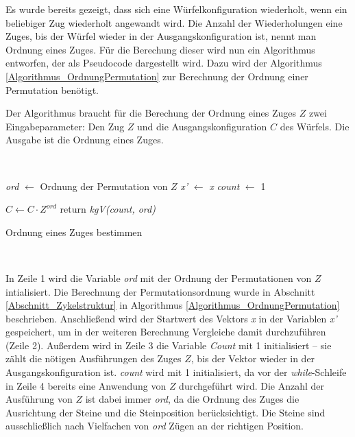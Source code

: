 \documentclass[12pt,a4paper, usenames, dvipsnames]{article}
\theoremstyle{mystyle}
\theoremstyle{definition}
\begin{document}
Es wurde bereits gezeigt, dass sich eine Würfelkonfiguration wiederholt, wenn ein beliebiger Zug wiederholt angewandt wird. Die Anzahl der Wiederholungen eine Zuges, bis der Würfel wieder in der Ausgangskonfiguration ist, nennt man Ordnung eines Zuges. Für die Berechung dieser wird nun ein Algorithmus entworfen, der als Pseudocode dargestellt wird. Dazu wird der Algorithmus \ref{Algorithmus_OrdnungPermutation} zur Berechnung der Ordnung einer Permutation benötigt.

Der Algorithmus braucht für die Berechung der Ordnung eines Zuges $Z$ zwei Eingabeparameter: Den Zug $Z$ und die Ausgangskonfiguration $C$ des Würfels. Die Ausgabe ist die Ordnung eines Zuges.


\begin{minipage}[H]{0.15\textwidth}
      $\ $
\end{minipage}
\begin{minipage}[H]{0.65\textwidth}
\begin{algorithm}[H]
\LinesNumbered
\DontPrintSemicolon
{}

 \textit{ord} $\leftarrow$ Ordnung der Permutation von $Z$\;
  \textit{x'} $\leftarrow$ \textit{x}\;
  \textit{count} $\leftarrow$ 1\;

  $C \leftarrow C \cdot  Z^\textit{ord}$ \; 
 return \textit{kgV(count, ord)} \;

\caption{Ordnung eines Zuges bestimmen} 
\label{Algorithmus_OrdnungZug}
\end{algorithm}
\end{minipage}
\begin{minipage}[H]{0.2\textwidth}
      $\ $
\end{minipage}

\vspace*{1em}

In Zeile 1 wird die Variable \textit{ord} mit der Ordnung der Permutationen von $Z$ intialisiert. Die Berechnung der Permutationsordnung wurde in Abschnitt \ref{Abschnitt_Zykelstruktur} in Algorithmus \ref{Algorithmus_OrdnungPermutation} beschrieben. Anschließend wird der Startwert des Vektors \textit{x} in der Variablen \textit{x'} gespeichert, um in der weiteren Berechnung Vergleiche damit durchzuführen (Zeile 2). Außerdem wird in Zeile 3 die Variable \textit{Count} mit 1 initialisiert -- sie zählt die nötigen Ausführungen des Zuges $Z$, bis der Vektor wieder in der Ausgangskonfiguration ist. \textit{count} wird mit 1 initialisiert, da vor der \textit{while}-Schleife in Zeile 4 bereits eine Anwendung von $Z$ durchgeführt wird. Die Anzahl der Ausführung von $Z$ ist dabei immer \textit{ord}, da die Ordnung des Zuges die Ausrichtung der Steine und die Steinposition berücksichtigt. Die Steine sind ausschließlich nach Vielfachen von \textit{ord} Zügen an der richtigen Position.
\end{document}
